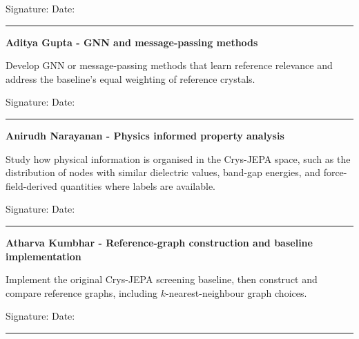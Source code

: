 \documentclass[10pt,a4paper]{article}
\begin{document}
\vspace{12mm}
\noindent Signature: \hrulefill\hspace{8mm} Date: \rule{30mm}{0.4pt}

\vspace{8mm}
\noindent{\color{navy!35}\rule{\textwidth}{0.5pt}}
\vspace{3mm}

\textbf{Aditya Gupta - GNN and message-passing methods}\par
Develop GNN or message-passing methods that learn reference relevance and address the baseline's equal weighting of reference crystals.

\vspace{12mm}
\noindent Signature: \hrulefill\hspace{8mm} Date: \rule{30mm}{0.4pt}

\vspace{8mm}
\noindent{\color{navy!35}\rule{\textwidth}{0.5pt}}
\vspace{3mm}

\textbf{Anirudh Narayanan - Physics informed property analysis}\par
Study how physical information is organised in the Crys-JEPA space, such as the distribution of nodes with similar dielectric values, band-gap energies, and force-field-derived quantities where labels are
available.

\vspace{12mm}
\noindent Signature: \hrulefill\hspace{8mm} Date: \rule{30mm}{0.4pt}

\vspace{8mm}
\noindent{\color{navy!35}\rule{\textwidth}{0.5pt}}
\vspace{3mm}

\textbf{Atharva Kumbhar - Reference-graph construction and baseline implementation}\par
Implement the original Crys-JEPA screening baseline, then construct and compare reference graphs, including $k$-nearest-neighbour graph choices.

\vspace{12mm}
\noindent Signature: \hrulefill\hspace{8mm} Date: \rule{30mm}{0.4pt}
\end{document}
